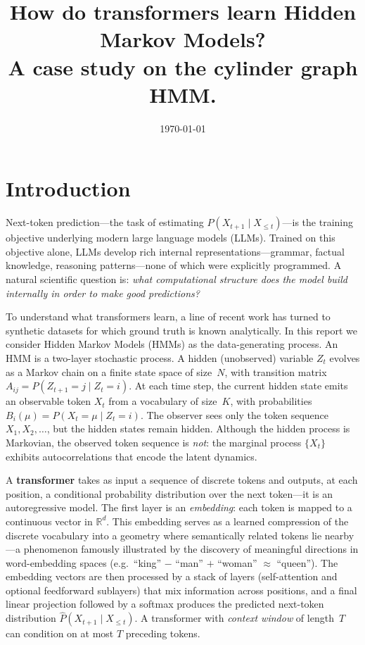 \documentclass[11pt]{article}
\title{How do transformers learn Hidden Markov Models?\\
       A case study on the cylinder graph HMM\@.}
\date{\today}
\begin{document}
\maketitle

\section{Introduction}\label{sec:intro}

Next-token prediction---the task of estimating $P(X_{t+1} \mid X_{\le t})$---is the training objective underlying modern large language models (LLMs).  Trained on this objective alone, LLMs develop rich internal representations---grammar, factual knowledge, reasoning patterns---none of which were explicitly programmed.  A natural scientific question is: \emph{what computational structure does the model build internally in order to make good predictions?}

To understand what transformers learn, a line of recent work has turned to synthetic datasets for which ground truth is known analytically.  In this report we consider Hidden Markov Models (HMMs) as the data-generating process.  An HMM is a two-layer stochastic process.  A hidden (unobserved) variable $Z_t$ evolves as a Markov chain on a finite state space of size~$N$, with transition matrix $A_{ij} = P(Z_{t+1}{=}j \mid Z_t{=}i)$.  At each time step, the current hidden state emits an observable token $X_t$ from a vocabulary of size~$K$, with probabilities $B_i(\mu) = P(X_t{=}\mu \mid Z_t{=}i)$.  The observer sees only the token sequence $X_1, X_2, \ldots$, but the hidden states remain hidden.  Although the hidden process is Markovian, the observed token sequence is \emph{not}: the marginal process $\{X_t\}$ exhibits autocorrelations that encode the latent dynamics.

A \textbf{transformer} takes as input a sequence of discrete tokens and outputs, at each position, a conditional probability distribution over the next token---it is an autoregressive model.  The first layer is an \emph{embedding}: each token is mapped to a continuous vector in $\mathbb{R}^d$.  This embedding serves as a learned compression of the discrete vocabulary into a geometry where semantically related tokens lie nearby---a phenomenon famously illustrated by the discovery of meaningful directions in word-embedding spaces (e.g.\ ``king'' $-$ ``man'' $+$ ``woman'' $\approx$ ``queen'').  The embedding vectors are then processed by a stack of layers (self-attention and optional feedforward sublayers) that mix information across positions, and a final linear projection followed by a softmax produces the predicted next-token distribution $\hat{P}(X_{t+1} \mid X_{\le t})$.  A transformer with \emph{context window} of length~$T$ can condition on at most $T$ preceding tokens.
\end{document}
